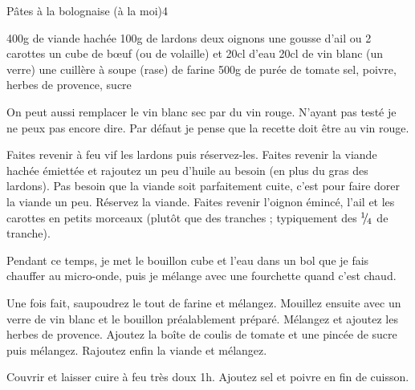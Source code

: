 \begin{recette}{Pâtes à la bolognaise (à la moi)}{4}{}{}
\begin{ingredients}
\ingredient 400g de viande hachée
\ingredient 100g de lardons
\ingredient deux oignons
\ingredient une gousse d'ail
 ou 2 carottes
\ingredient un cube de bœuf (ou de volaille) et 20cl d'eau
\ingredient 20cl de vin blanc (un verre)
\ingredient une cuillère à soupe (rase) de farine
\ingredient 500g de purée de tomate
\ingredient sel, poivre, herbes de provence, sucre
\end{ingredients}

\begin{remarque}
On peut aussi remplacer le vin blanc sec par du vin rouge. N'ayant pas testé je ne peux pas encore dire. Par défaut je pense que la recette doit être au vin rouge.
\end{remarque}


\begin{preparation}
\etape Faites revenir à feu vif les lardons puis réservez-les.
\etape Faites revenir la viande hachée émiettée et rajoutez un peu d'huile au besoin (en plus du gras des lardons). Pas besoin que la viande soit parfaitement cuite, c'est pour faire dorer la viande un peu.
\etape Réservez la viande.
\etape Faites revenir l'oignon émincé, l'ail et les carottes en petits morceaux (plutôt que des tranches ; typiquement des ${{}^{1\!\!}/ _{\!4}}$ de tranche).
\begin{remarque}
Pendant ce temps, je met le bouillon cube et l'eau dans un bol que je fais chauffer au micro-onde, puis je mélange avec une fourchette quand c'est chaud.
\end{remarque}
\etape Une fois fait, saupoudrez le tout de farine et mélangez. Mouillez ensuite avec un verre de vin blanc et le bouillon préalablement préparé. Mélangez et ajoutez les herbes de provence.
\etape Ajoutez la boîte de coulis de tomate et une pincée de sucre puis mélangez.
\etape Rajoutez enfin la viande et mélangez.
\end{preparation}

\begin{cuisson}
Couvrir et laisser cuire à feu très doux 1h. Ajoutez sel et poivre en fin de cuisson.
\end{cuisson}
\end{recette}

